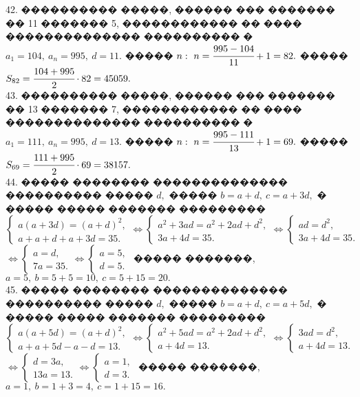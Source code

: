 \documentclass[12pt]{article}
\begin{document}
42. ���������� �����, ������ ��� ������� �� 11 ������� 5, ������������ �� ���� �������������� ���������� � $a_1=104,\ a_n=995,\ d=11.$ ����� $n:\ n=\cfrac{995-104}{11}+1=82.$ ����� $S_{82}=\cfrac{104+995}{2}\cdot82=45059.$\\
43. ���������� �����, ������ ��� ������� �� 13 ������� 7, ������������ �� ���� �������������� ���������� � $a_1=111,\ a_n=995,\ d=13.$ ����� $n:\ n=\cfrac{995-111}{13}+1=69.$ ����� $S_{69}=\cfrac{111+995}{2}\cdot69=38157.$\\
44. ����� �������� �������������� ���������� ����� $d,$ ����� $b=a+d,\ c=a+3d,$ � ����� ����� ������� ���������
$\begin{cases} a(a+3d)=(a+d)^2,\\ a+a+d+a+3d=35.\end{cases}\Leftrightarrow\begin{cases} a^2+3ad=a^2+2ad+d^2,\\ 3a+4d=35.\end{cases}\Leftrightarrow
\begin{cases} ad=d^2,\\ 3a+4d=35.\end{cases}$\\$\Leftrightarrow\begin{cases} a=d,\\ 7a=35.\end{cases}
\Leftrightarrow\begin{cases} a=5,\\ d=5.\end{cases}$ ����� �������, $a=5,\ b=5+5=10,\ c=5+15=20.$\\
45. ����� �������� �������������� ���������� ����� $d,$ ����� $b=a+d,\ c=a+5d,$ � ����� ����� ������� ���������
$\begin{cases} a(a+5d)=(a+d)^2,\\ a+a+5d-a-d=13.\end{cases}\Leftrightarrow\begin{cases} a^2+5ad=a^2+2ad+d^2,\\ a+4d=13.\end{cases}\Leftrightarrow
\begin{cases} 3ad=d^2,\\ a+4d=13.\end{cases}$\\$\Leftrightarrow\begin{cases} d=3a,\\ 13a=13.\end{cases}
\Leftrightarrow\begin{cases} a=1,\\ d=3.\end{cases}$ ����� �������, $a=1,\ b=1+3=4,\ c=1+15=16.$\\
\end{document}
